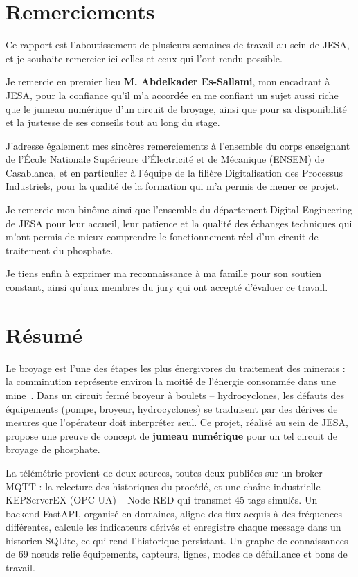 \chapter*{Remerciements}

Ce rapport est l'aboutissement de plusieurs semaines de travail au sein de JESA, et je souhaite remercier ici celles et ceux qui l'ont rendu possible.

Je remercie en premier lieu \textbf{M. Abdelkader Es-Sallami}, mon encadrant à JESA, pour la confiance qu'il m'a accordée en me confiant un sujet aussi riche que le jumeau numérique d'un circuit de broyage, ainsi que pour sa disponibilité et la justesse de ses conseils tout au long du stage.

J'adresse également mes sincères remerciements à l'ensemble du corps enseignant de l'École Nationale Supérieure d'Électricité et de Mécanique (ENSEM) de Casablanca, et en particulier à l'équipe de la filière Digitalisation des Processus Industriels, pour la qualité de la formation qui m'a permis de mener ce projet.

Je remercie mon binôme ainsi que l'ensemble du département Digital Engineering de JESA pour leur accueil, leur patience et la qualité des échanges techniques qui m'ont permis de mieux comprendre le fonctionnement réel d'un circuit de traitement du phosphate.

Je tiens enfin à exprimer ma reconnaissance à ma famille pour son soutien constant, ainsi qu'aux membres du jury qui ont accepté d'évaluer ce travail.

\chapter*{Résumé}

Le broyage est l'une des étapes les plus énergivores du traitement des minerais : la comminution représente environ la moitié de l'énergie consommée dans une mine~\cite{jeswiet2016}. Dans un circuit fermé broyeur à boulets -- hydrocyclones, les défauts des équipements (pompe, broyeur, hydrocyclones) se traduisent par des dérives de mesures que l'opérateur doit interpréter seul. Ce projet, réalisé au sein de JESA, propose une preuve de concept de \textbf{jumeau numérique} pour un tel circuit de broyage de phosphate.

La télémétrie provient de deux sources, toutes deux publiées sur un broker MQTT : la relecture des historiques du procédé, et une chaîne industrielle KEPServerEX (OPC UA) -- Node-RED qui transmet 45 tags simulés. Un backend FastAPI, organisé en domaines, aligne des flux acquis à des fréquences différentes, calcule les indicateurs dérivés et enregistre chaque message dans un historien SQLite, ce qui rend l'historique persistant. Un graphe de connaissances de 69 nœuds relie équipements, capteurs, lignes, modes de défaillance et bons de travail.

